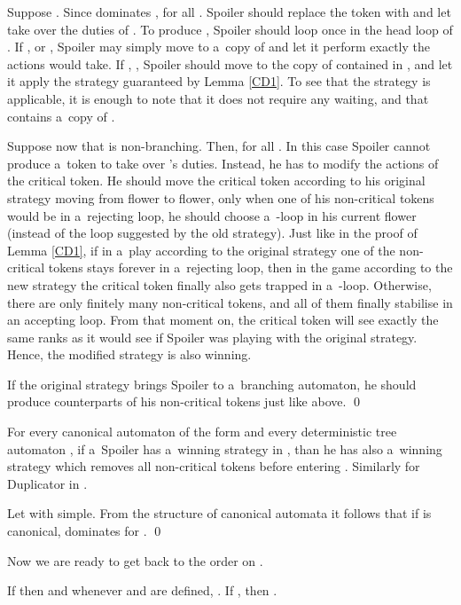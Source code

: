 \documentclass{LMCS}
\begin{document}
Suppose . Since  dominates ,  for all . Spoiler should replace the token  with  and let  take over the duties of . To produce , Spoiler should loop once in the head loop of . If , or , Spoiler may simply move  to  a~copy of  and let it perform exactly the actions  would take. If , , Spoiler should move  to the copy of  contained in , and let it apply the strategy guaranteed by Lemma \ref{CD1}. To see that the strategy is applicable, it is enough to note that it does not require any waiting, and that  contains a~copy of .

Suppose now that  is non-branching. Then,  for all . In this case Spoiler cannot produce a~token to take over 's duties. Instead, he has to modify the actions of the critical token. He should move the critical token according to his original strategy moving from flower to flower, only when one of his non-critical tokens would be in a~rejecting loop, he should choose a~-loop in his current flower (instead of the loop suggested by the old strategy). Just like in the proof of Lemma \ref{CD1}, if in a~play according to the original strategy one of the non-critical tokens stays forever in a~rejecting loop, then in the game according to the new strategy the critical token finally also gets trapped in a~-loop. Otherwise, there are only finitely many non-critical tokens, and all of them finally stabilise in an accepting loop. From that moment on, the critical token will see exactly the same ranks as it would see if Spoiler was playing with the original strategy. Hence, the modified strategy is also winning. 

If the original strategy brings Spoiler to a~branching automaton, he should produce counterparts of his non-critical tokens just like above. \qed


\begin{cor} \label{resetrule2}
For every canonical automaton of the form   and every deterministic tree automaton , if a~Spoiler has a~winning strategy in , than he has also a~winning strategy which removes all non-critical tokens before entering . Similarly for Duplicator in .
\end{cor}

\proof Let  with  simple. From the structure of canonical automata it follows that if  is canonical,  dominates  for . \qed

\vspace{5pt}

Now we are ready to get back to the order on . 

\begin{lem} \label{order}
If  then 
 and whenever  and  are defined,
. If , then 
.
\end{lem}
\end{document}
